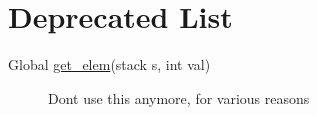 \hypertarget{deprecated}{}\section{Deprecated List}\label{deprecated}
\label{_deprecated000001}
\hypertarget{deprecated__deprecated000001}{}
\begin{description}
\item[Global \hyperlink{stack_8h_a5}{get\_\-elem}(stack s, int val) ]
Dont use this anymore, for various reasons\end{description}
 